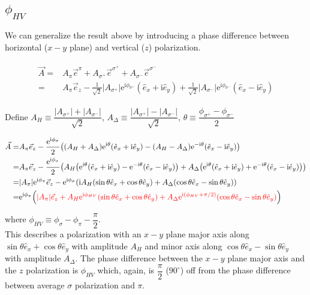 \documentclass[10pt,fleqn]{article}
\newcommand{\ue}{\mathrm{e}}
\newcommand{\ui}{\mathrm{i}}
\newcommand{\eqar}[1]
{
  \begin{align}
    #1
  \end{align}
}
\newcommand{\paren}[1]{{\left({#1}\right)}}
\newcommand{\abs}[1]{{\left|{#1}\right|}}
\begin{document}
\subsection{$\phi_{HV}$}
We can generalize the result above by introducing a phase difference between
horizontal ($x-y$ plane) and vertical ($z$) polarization.
\eqar{
  \begin{split}
    \vec A=&A_\pi\vec e^\pi+A_{\sigma^+}\vec e^{\sigma^+}+A_{\sigma^-}\vec e^{\sigma^-}\\
    =&A_\pi\vec e_z-\frac{1}{\sqrt{2}}\abs{A_{\sigma^+}}\ue^{\ui\phi_{\sigma^+}}\paren{\hat e_x+\ui\hat e_y}+\frac{1}{\sqrt{2}}\abs{A_{\sigma^-}}\ue^{\ui\phi_{\sigma^-}}\paren{\hat e_x-\ui\hat e_y}
  \end{split}
}
Define {\color{red}$A_H\equiv\dfrac{\abs{A_{\sigma^+}}+\abs{A_{\sigma^-}}}{\sqrt2}$, $A_\Delta\equiv\dfrac{\abs{A_{\sigma^+}}-\abs{A_{\sigma^-}}}{\sqrt2}$, $\theta\equiv\dfrac{\phi_{\sigma^+}-\phi_{\sigma^-}}{2}$}
\eqar{
  \begin{split}
    \vec A=&A_\pi\vec e_z-\frac{\ue^{\ui\phi_{\sigma}}}{2}\paren{\paren{A_H+A_\Delta}\ue^{\ui\theta}\paren{\hat e_x+\ui\hat e_y}-\paren{A_H-A_\Delta}\ue^{-\ui\theta}\paren{\hat e_x-\ui\hat e_y}}\\
    =&A_\pi\vec e_z-\frac{\ue^{\ui\phi_{\sigma}}}{2}\paren{
       A_H\paren{\ue^{\ui\theta}\paren{\hat e_x+\ui\hat e_y}
       -\ue^{-\ui\theta}\paren{\hat e_x-\ui\hat e_y}}
       +A_\Delta\paren{\ue^{\ui\theta}\paren{\hat e_x+\ui\hat e_y}
       +\ue^{-\ui\theta}\paren{\hat e_x-\ui\hat e_y}
       }
       }\\
    =&\abs{A_\pi}\ue^{\ui\phi_{\pi}}\vec e_z-\ue^{\ui\phi_{\sigma}}\paren{
       \ui A_H\paren{\sin\theta\hat e_x+\cos\theta\hat e_y}
       +A_\Delta\paren{\cos\theta\hat e_x-\sin\theta\hat e_y}
       }\\
    =&\ue^{\ui\phi_{\pi}}\paren{\color{red}{
       \abs{A_\pi}\vec e_z
       +A_H \ue^{\ui\phi_{HV}}\paren{\sin\theta\hat e_x+\cos\theta\hat e_y}
       +A_\Delta\ue^{\ui\paren{\phi_{HV}+\pi/2}}
       \paren{\cos\theta\hat e_x-\sin\theta\hat e_y}
       }}
  \end{split}
}
where {\color{red}$\phi_{HV}\equiv\phi_{\sigma}-\phi_\pi-\dfrac{\pi}{2}$}.\\

This describes a polarization with an $x-y$ plane major axis along $\sin\theta\hat e_x+\cos\theta\hat e_y$ with amplitude $A_H$ and minor axis along $\cos\theta\hat e_x-\sin\theta\hat e_y$ with amplitude $A_\Delta$. The phase difference between the $x-y$ plane major axis and the $z$ polarization is $\phi_{HV}$ which, again, is $\dfrac\pi2$ ($90^\circ$) off from the phase difference between average $\sigma$ polarization and $\pi$.
\end{document}
